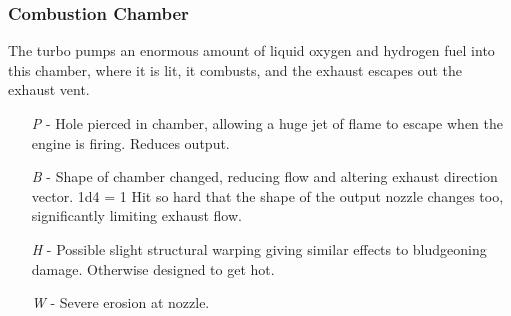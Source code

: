\documentclass[a4paper]{article}
\begin{document}
\vspace{-0.5cm} \hspace{-18pt} \subsubsection{Combustion Chamber} \label{engine_combustion} \vspace{-0.2cm}
The turbo pumps an enormous amount of liquid oxygen and hydrogen fuel into this chamber, where it is lit, it combusts, and the exhaust escapes out the exhaust vent. 
\begin{enumerate}
\item [\textit{P}] - Hole pierced in chamber, allowing a huge jet of flame to escape when the engine is firing. Reduces output.
\item [\textit{B}] - Shape of chamber changed, reducing flow and altering exhaust direction vector. \newline \hspace{3pt} 1d4 = 1 Hit so hard that the shape of the output nozzle changes too, significantly limiting exhaust flow. 
\item [\textit{H}] - Possible slight structural warping giving similar effects to bludgeoning damage. Otherwise designed to get hot.
\item [\textit{W}] - Severe erosion at nozzle.
\end{enumerate}
\end{document}
